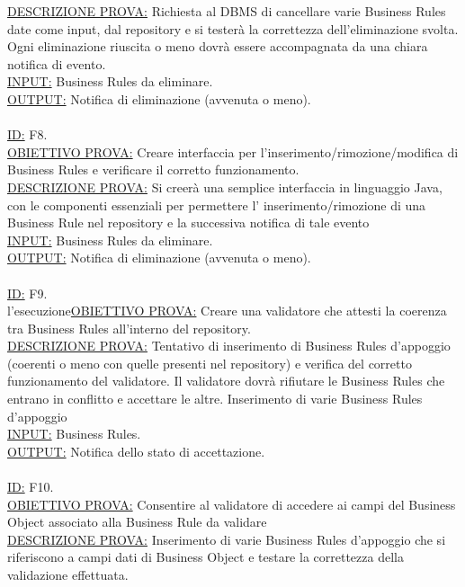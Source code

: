 \documentclass[11pt,titlepage,a4paper]{report}
\begin{document}
\underline{DESCRIZIONE PROVA:} Richiesta al DBMS di cancellare varie Business Rules date come input, dal repository e si tester\`a la correttezza dell'eliminazione svolta. Ogni eliminazione riuscita o meno dovr\`a essere accompagnata da una chiara notifica di evento.\\
\underline{INPUT:} Business Rules da eliminare.\\
\underline{OUTPUT:} Notifica di eliminazione (avvenuta o meno).\\
\\
\underline{ID:} F8.\\
\underline{OBIETTIVO PROVA:} Creare interfaccia per l'inserimento/rimozione/modifica di Business Rules e verificare il corretto funzionamento. \\
\underline{DESCRIZIONE PROVA:} Si creer\`a  una semplice interfaccia in linguaggio Java, con le componenti essenziali per permettere l' inserimento/rimozione di una Business Rule nel repository e la successiva notifica di tale evento\\
\underline{INPUT:} Business Rules da eliminare.\\
\underline{OUTPUT:} Notifica di eliminazione (avvenuta o meno).\\
\\
\underline{ID:} F9.\\
l'esecuzione\underline{OBIETTIVO PROVA:} Creare una validatore che attesti la coerenza tra Business Rules all'interno del repository. \\
\underline{DESCRIZIONE PROVA:} Tentativo di inserimento di Business Rules d'appoggio (coerenti o meno con quelle presenti nel repository) e verifica del corretto funzionamento del validatore. Il validatore dovr\`a rifiutare le Business Rules che entrano in conflitto e accettare le altre. Inserimento di varie Business Rules d'appoggio\\
\underline{INPUT:} Business Rules. \\
\underline{OUTPUT:} Notifica dello stato di accettazione. \\
\\
\underline{ID:} F10.\\
\underline{OBIETTIVO PROVA:} Consentire al validatore di accedere ai campi del Business Object associato alla Business Rule da validare\\
\underline{DESCRIZIONE PROVA:} Inserimento di varie Business Rules d'appoggio che si riferiscono a campi dati di Business Object e testare la correttezza della validazione effettuata.\\
\end{document}
